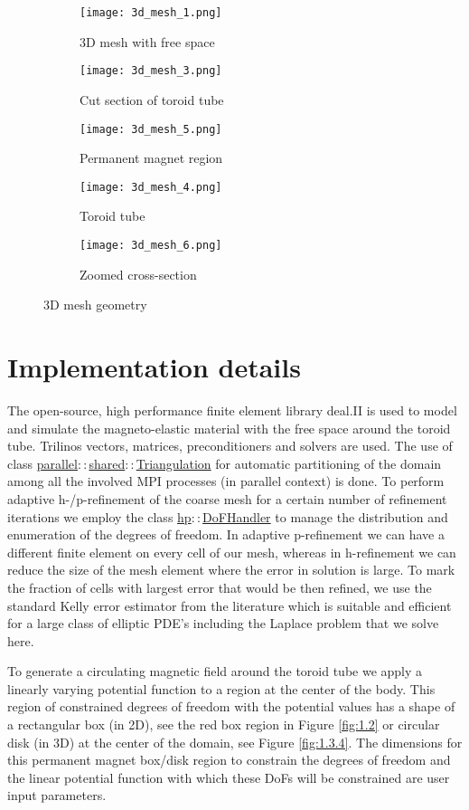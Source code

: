 \begin{figure}[htb]
\centering
\begin{subfigure}[b]{0.39\textwidth}
\centering
\texttt{[image: 3d\_mesh\_1.png]}
\caption{3D mesh with free space}
\label{fig:1.3.1}
\end{subfigure}
\begin{subfigure}[b]{0.29\textwidth}
\centering
\texttt{[image: 3d\_mesh\_3.png]}
\label{fig:1.3.2}
\caption{Cut section of toroid tube}
\texttt{[image: 3d\_mesh\_5.png]}
\caption{Permanent magnet region}
\label{fig:1.3.4}
\end{subfigure}
\begin{subfigure}[b]{0.29\textwidth}
\centering
\texttt{[image: 3d\_mesh\_4.png]}
\caption{Toroid tube}
\label{fig:1.3.3}
\texttt{[image: 3d\_mesh\_6.png]}
\caption{Zoomed cross-section}
\label{fig:1.3.5}
\end{subfigure}
\caption{3D mesh geometry}
\label{fig:1.3}
\end{figure}

\section{Implementation details}
The open-source, high performance finite element library deal.II \cite{BangerthHartmannKanschat2007,dealII90} is used to model and simulate the magneto-elastic material with the free space around the toroid tube. Trilinos \cite{trilinos} vectors, matrices, preconditioners and solvers are used. The use of class  \href{https://www.dealii.org/current/doxygen/deal.II/classparallel_1_1shared_1_1Triangulation.html}{parallel$::$shared$::$Triangulation} for automatic partitioning of the domain among all the involved MPI processes (in parallel context) is done. To perform adaptive h-/p-refinement of the coarse mesh for a certain number of refinement iterations we employ the class \href{https://www.dealii.org/current/doxygen/deal.II/classhp_1_1DoFHandler.html}{hp$::$DoFHandler} to manage the distribution and enumeration of the degrees of freedom. In adaptive p-refinement we can have a different finite element on every cell of our mesh, whereas in h-refinement we can reduce the size of the mesh element where the error in solution is large. To mark the fraction of cells with largest error that would be then refined, we use the standard Kelly error estimator from the literature which is suitable and efficient for a large class of elliptic PDE's including the Laplace problem that we solve here. \par 
To generate a circulating magnetic field around the toroid tube we apply a linearly varying potential function to a region at the center of the body. This region of constrained degrees of freedom with the potential values has a shape of a rectangular box (in 2D), see the red box region in Figure \eqref{fig:1.2} or circular disk (in 3D) at the center of the domain, see Figure \eqref{fig:1.3.4}. The dimensions for this permanent magnet box/disk region to constrain the degrees of freedom and the linear potential function with which these DoFs will be constrained are user input parameters. \par 

